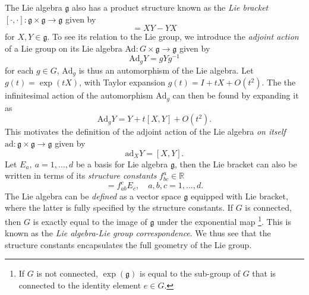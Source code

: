 The Lie algebra $\mathfrak{g}$ also has a product structure known as the \textit{Lie bracket} $[\cdot, \cdot] : \mathfrak{g} \times \mathfrak{g} \to \mathfrak{g}$ given by
\begin{equation}
[X, Y] = XY - YX
\end{equation}
for $X,Y \in \mathfrak{g}$. To see its relation to the Lie group, we introduce the \textit{adjoint action} of a Lie group on its Lie algebra  $\text{Ad} : G \times \mathfrak{g} \to \mathfrak{g}$ given by
\begin{equation}
\text{Ad}_g Y = g Y g^{-1}
\end{equation}
for each $g\in G$, $\text{Ad}_g$ is thus an automorphism of the Lie algebra. Let $g(t) = \exp(t X)$, with Taylor expansion $g(t) = I + t X + O(t^2)$. The the infinitesimal action of the automorphism $\text{Ad}_g$ can then be found by expanding it as
\begin{equation}
\text{Ad}_g Y = Y + t[X, Y] + O(t^2).
\end{equation}
This motivates the definition of the adjoint action of the Lie algebra \textit{on itself} $\text{ad} : \mathfrak{g} \times \mathfrak{g} \to \mathfrak{g}$ given by
\begin{equation}
\text{ad}_X Y = [X, Y].
\end{equation}
Let $E_a,\ a=1,\dots,d$ be a basis for Lie algebra $\mathfrak{g}$, then the Lie bracket can also be written in terms of its \textit{structure constants} $f^a_{bc} \in \mathbb{R}$
\begin{equation}
[E_a, E_b] = f_{ab}^c E_c, \quad a,b,c=1,\dots,d.
\end{equation}
The Lie algebra can be \textit{defined} as a vector space $\mathfrak{g}$ equipped with Lie bracket, where the latter is fully specified by the structure constants. If $G$ is connected, then $G$ is exactly equal to the image of $\mathfrak{g}$ under the exponential map \footnote{If $G$ is not connected, $\exp(\mathfrak{g})$ is equal to the sub-group of $G$ that is connected to the identity element $e \in G$.}. This is known as the \textit{Lie algebra-Lie group correspondence}. We thus see that the structure constants encapsulates the full geometry of the Lie group.

